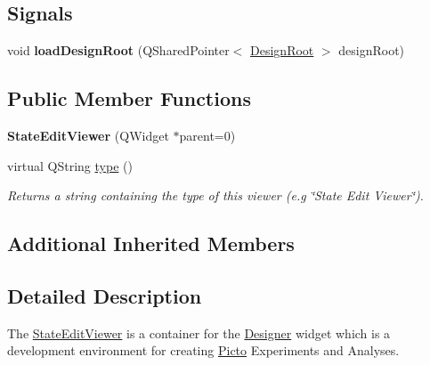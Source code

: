 \subsection*{Signals}
\begin{DoxyCompactItemize}
\item 
\hypertarget{class_state_edit_viewer_addc226e2aae1c88541f06d7f2efd90b7}{void {\bfseries load\-Design\-Root} (Q\-Shared\-Pointer$<$ \hyperlink{class_picto_1_1_design_root}{Design\-Root} $>$ design\-Root)}\label{class_state_edit_viewer_addc226e2aae1c88541f06d7f2efd90b7}

\end{DoxyCompactItemize}
\subsection*{Public Member Functions}
\begin{DoxyCompactItemize}
\item 
\hypertarget{class_state_edit_viewer_aef9b3994818edb2cb2cd56cf4ec8d944}{{\bfseries State\-Edit\-Viewer} (Q\-Widget $\ast$parent=0)}\label{class_state_edit_viewer_aef9b3994818edb2cb2cd56cf4ec8d944}

\item 
\hypertarget{class_state_edit_viewer_a17c639bb6eee18ca0d4ee4c567106b4b}{virtual Q\-String \hyperlink{class_state_edit_viewer_a17c639bb6eee18ca0d4ee4c567106b4b}{type} ()}\label{class_state_edit_viewer_a17c639bb6eee18ca0d4ee4c567106b4b}

\begin{DoxyCompactList}\small\item\em Returns a string containing the type of this viewer (e.\-g \char`\"{}\-State Edit Viewer\char`\"{}). \end{DoxyCompactList}\end{DoxyCompactItemize}
\subsection*{Additional Inherited Members}


\subsection{Detailed Description}
The \hyperlink{class_state_edit_viewer}{State\-Edit\-Viewer} is a container for the \hyperlink{class_designer}{Designer} widget which is a development environment for creating \hyperlink{namespace_picto}{Picto} Experiments and Analyses. 

